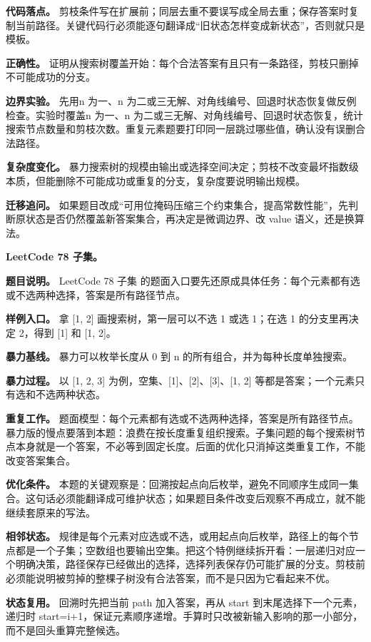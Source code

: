 \textbf{代码落点。} 剪枝条件写在扩展前；同层去重不要误写成全局去重；保存答案时复制当前路径。关键代码行必须能逐句翻译成“旧状态怎样变成新状态”，否则就只是模板。

\textbf{正确性。} 证明从搜索树覆盖开始：每个合法答案有且只有一条路径，剪枝只删掉不可能成功的分支。

\textbf{边界实验。} 先用n 为一、n 为二或三无解、对角线编号、回退时状态恢复做反例检查。实验时覆盖n 为一、n 为二或三无解、对角线编号、回退时状态恢复，统计搜索节点数量和剪枝次数。重复元素题要打印同一层跳过哪些值，确认没有误删合法路径。

\textbf{复杂度变化。} 暴力搜索树的规模由输出或选择空间决定；剪枝不改变最坏指数级本质，但能删除不可能成功或重复的分支，复杂度要说明输出规模。

\textbf{迁移追问。} 如果题目改成“可用位掩码压缩三个约束集合，提高常数性能”，先判断原状态是否仍然覆盖新答案集合，再决定是微调边界、改 value 语义，还是换算法。

\noindent\textbf{LeetCode 78 子集。}

\textbf{题目说明。} LeetCode 78 子集 的题面入口要先还原成具体任务：每个元素都有选或不选两种选择，答案是所有路径节点。

\textbf{样例入口。} 拿 [1, 2] 画搜索树，第一层可以不选 1 或选 1；在选 1 的分支里再决定 2，得到 [1] 和 [1, 2]。

\textbf{暴力基线。} 暴力可以枚举长度从 0 到 n 的所有组合，并为每种长度单独搜索。

\textbf{暴力过程。} 以 [1, 2, 3] 为例，空集、[1]、[2]、[3]、[1, 2] 等都是答案；一个元素只有选和不选两种状态。

\textbf{重复工作。} 题面模型：每个元素都有选或不选两种选择，答案是所有路径节点。暴力版的慢点要落到本题：浪费在按长度重复组织搜索。子集问题的每个搜索树节点本身就是一个答案，不必等到固定长度。后面的优化只消掉这类重复工作，不能改变答案集合。

\textbf{优化条件。} 本题的关键观察是：回溯按起点向后枚举，避免不同顺序生成同一集合。这句话必须能翻译成可维护状态；如果题目条件改变后观察不再成立，就不能继续套原来的写法。

\textbf{相邻状态。} 规律是每个元素对应选或不选，或用起点向后枚举，路径上的每个节点都是一个子集；空数组也要输出空集。把这个特例继续拆开看：一层递归对应一个明确决策，路径保存已经做出的选择，选择列表保存仍可能扩展的分支。剪枝前必须能说明被剪掉的整棵子树没有合法答案，而不是只因为它看起来不优。

\textbf{状态复用。} 回溯时先把当前 path 加入答案，再从 start 到末尾选择下一个元素，递归时 start=i+1，保证元素顺序递增。手算时只改被新输入影响的那一小部分，而不是回头重算完整候选。

